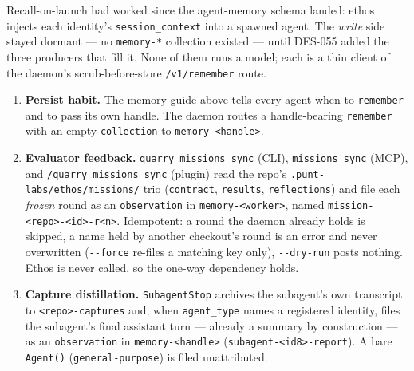 \documentclass[a4paper,10pt]{article}
\begin{document}
Recall-on-launch had worked since the agent-memory schema landed: ethos
injects each identity's \texttt{session\_context} into a spawned agent.
The \emph{write} side stayed dormant --- no \texttt{memory-*} collection
existed --- until DES-055 added the three producers that fill it.  None of
them runs a model; each is a thin client of the daemon's
scrub-before-store \texttt{/v1/remember} route.

\begin{enumerate}[label=\textbf{Loop \arabic*}.]
  \item \textbf{Persist habit.}  The memory guide above tells every agent
    when to \texttt{remember} and to pass its own handle.  The daemon
    routes a handle-bearing \texttt{remember} with an empty
    \texttt{collection} to \texttt{memory-<handle>}.
  \item \textbf{Evaluator feedback.}  \texttt{quarry missions sync} (CLI),
    \texttt{missions\_sync} (MCP), and \texttt{/quarry missions sync}
    (plugin) read the repo's \texttt{.punt-labs/ethos/missions/} trio
    (\texttt{contract}, \texttt{results}, \texttt{reflections}) and file
    each \emph{frozen} round as an \texttt{observation} in
    \texttt{memory-<worker>}, named
    \texttt{mission-<repo>-<id>-r<n>}.  Idempotent: a round the daemon
    already holds is skipped, a name held by another checkout's round is
    an error and never overwritten (\texttt{-{}-force} re-files a matching
    key only), \texttt{-{}-dry-run} posts nothing.  Ethos is never called,
    so the one-way dependency holds.
  \item \textbf{Capture distillation.}  \texttt{SubagentStop} archives the
    subagent's own transcript to \texttt{<repo>-captures} and, when
    \texttt{agent\_type} names a registered identity, files the subagent's
    final assistant turn --- already a summary by construction --- as an
    \texttt{observation} in \texttt{memory-<handle>}
    (\texttt{subagent-<id8>-report}).  A bare \texttt{Agent()}
    (\texttt{general-purpose}) is filed unattributed.
\end{enumerate}
\end{document}

